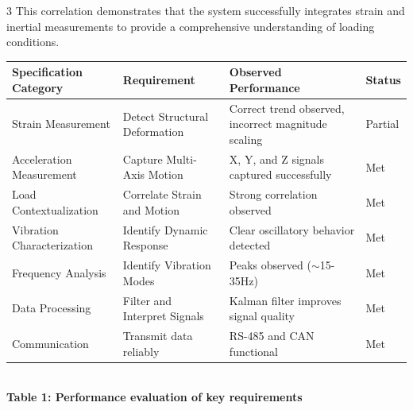 \documentclass[landscape]{a0poster}
\begin{document}
\begin{multicols}{3}
  This correlation demonstrates that the system successfully integrates strain and inertial measurements to provide a comprehensive understanding of loading conditions.



  \begin{center}
    \footnotesize
    \renewcommand{\arraystretch}{1.6} %
    \begin{tabularx}{\linewidth}{>{\raggedright\arraybackslash}p{6cm} X X >{\centering\arraybackslash}p{2cm}}
        \toprule
        \textbf{Specification Category} & \textbf{Requirement} & \textbf{Observed Performance} & \textbf{Status} \\
        \midrule
        Strain Measurement & Detect Structural Deformation & Correct trend observed, incorrect magnitude scaling & Partial \\
        \hline
        Acceleration Measurement & Capture Multi-Axis Motion & X, Y, and Z signals captured successfully & Met \\
        \hline
        Load Contextualization & Correlate Strain and Motion & Strong correlation observed & Met \\
        \hline
        Vibration Characterization & Identify Dynamic Response & Clear oscillatory behavior detected & Met \\
        \hline
        Frequency Analysis & Identify Vibration Modes & Peaks observed ($\sim$15-35Hz) & Met \\
        \hline
        Data Processing & Filter and Interpret Signals & Kalman filter improves signal quality & Met \\
        \hline
        Communication & Transmit data reliably & RS-485 and CAN functional & Met \\
        \bottomrule
    \end{tabularx}
    \small
    \\
    \vspace{0.2cm}
    \textbf{Table 1: Performance evaluation of key requirements}
    \label{performance_table}
  \end{center}

  \vspace{-0.2cm}


\end{multicols}
\end{document}
